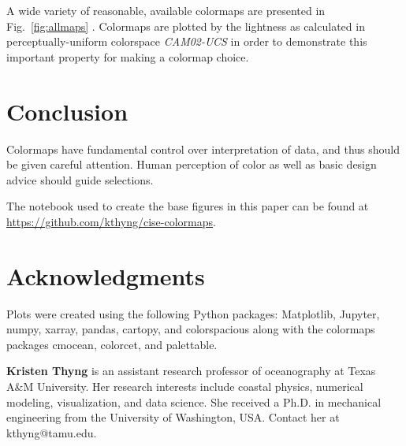 \documentclass[10pt,journal,compsoc]{IEEEtran}
\begin{document}
A wide variety of reasonable, available colormaps are presented in Fig.~\ref{fig:allmaps} \citep{hunter2007matplotlib,light2004end,brewer,crameri2018geodynamic,mycarta}. Colormaps are plotted by the lightness as calculated in perceptually-uniform colorspace \textit{CAM02-UCS} in order to demonstrate this important property for making a colormap choice.




\section{Conclusion}

Colormaps have fundamental control over interpretation of data, and thus should be given careful attention. Human perception of color as well as basic design advice should guide selections.

The notebook used to create the base figures in this paper can be found at \url{https://github.com/kthyng/cise-colormaps}.


\section{Acknowledgments}

Plots were created using the following Python packages: Matplotlib, Jupyter, numpy, xarray, pandas, cartopy, and colorspacious along with the colormaps packages cmocean, colorcet, and palettable.






\bigskip

\textbf{Kristen Thyng} is an assistant research professor of oceanography at Texas A\&M University. Her research interests include coastal physics, numerical modeling, visualization, and data science. She received a Ph.D. in mechanical engineering from the University of Washington, USA. Contact her at kthyng@tamu.edu.
\end{document}
